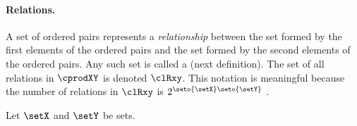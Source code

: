 \paragraph{Relations.}
A set of ordered pairs represents a \emph{relationship} between
the set formed by the first elements of the ordered pairs 
and the set formed by the second elements of the ordered pairs.
Any such set is called a  (next definition).
The set of all relations in $\cprodXY$ is denoted $\clRxy$.
This notation is meaningful because the number of relations in $\clRxy$ is
$2^{\seto{\setX}\seto{\setY}}$ .

\begin{definition}
\label{def:fnd_relation}
Let $\setX$ and $\setY$ be sets.
\end{definition}



%


